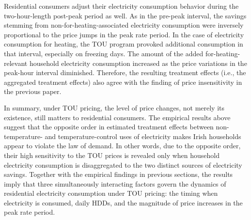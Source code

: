 Residential consumers adjust their electricity consumption behavior during the two-hour-length post-peak period as well. As in the pre-peak interval, the savings stemming from non-for-heating-associated electricity consumption were inversely proportional to the price jumps in the peak rate period. In the case of electricity consumption for heating, the TOU program provoked additional consumption in that interval, especially on freezing days. The amount of the added for-heating-relevant household electricity consumption increased as the price variations in the peak-hour interval diminished. Therefore, the resulting treatment effects (i.e., the aggregated treatment effects) also agree with the finding of price insensitivity in the previous paper. 

In summary, under TOU pricing, the level of price changes, not merely its existence, still matters to residential consumers. The empirical results above suggest that the opposite order in estimated treatment effects between non-temperature- and temperature-control uses of electricity makes Irish households appear to violate the law of demand. In other words, due to the opposite order, their high sensitivity to the TOU prices is revealed only when household electricity consumption is disaggregated to the two distinct sources of electricity savings. Together with the empirical findings in previous sections, the results imply that three simultaneously interacting factors govern the dynamics of residential electricity consumption under TOU pricing: the timing when electricity is consumed, daily HDDs, and the magnitude of price increases in the peak rate period. 

